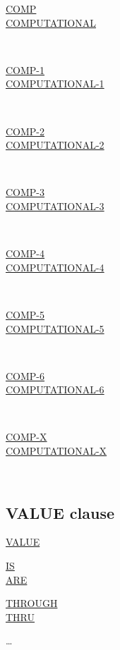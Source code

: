 \documentclass[a4paper,oneside,svgnames]{scrbook}
\makeatletter
\newcommand{\key}[1]{\underline{#1}}
\newcommand{\xopen}[1]{%
  \colorbox{green!75}{#1}}
\newcommand{\miscext}[1]{%
  \colorbox{blue!50}{#1}}
\newenvironment{0-1}{$\left[ \begin{tabular}{@{}l@{}}}{\end{tabular} \right]$}
\newenvironment{1=}{$\left\{ \begin{tabular}{@{}l@{}}}{\end{tabular} \right\}$}
\makeatother
\begin{document}
\begin{1=}
  \begin{1=}
    \key{COMP} \\
    \key{COMPUTATIONAL}
  \end{1=} \\

  \miscext{
    \begin{1=}
      \key{COMP-1} \\
      \key{COMPUTATIONAL-1}
    \end{1=}
  } \\

  \miscext{
    \begin{1=}
      \key{COMP-2} \\
      \key{COMPUTATIONAL-2}
    \end{1=}
  } \\

  \xopen{
    \begin{1=}
      \key{COMP-3} \\
      \key{COMPUTATIONAL-3}
    \end{1=}
  } \\

  \miscext{
    \begin{1=}
      \key{COMP-4} \\
      \key{COMPUTATIONAL-4}
    \end{1=}
  } \\

  \xopen{
    \begin{1=}
      \key{COMP-5} \\
      \key{COMPUTATIONAL-5}
    \end{1=}
  } \\

  \miscext{
    \begin{1=}
      \key{COMP-6} \\
      \key{COMPUTATIONAL-6}
    \end{1=}
  } \\

  \miscext{
    \begin{1=}
      \key{COMP-X} \\
      \key{COMPUTATIONAL-X}
    \end{1=}
  } \\
\end{1=}

\subsection{VALUE clause}
\key{VALUE}
\begin{0-1}
  \key{IS} \\
  \key{ARE}
\end{0-1}
\begin{1=}
  \literal
  \begin{0-1}
    \begin{1=}
      \key{THROUGH} \\
      \key{THRU}
    \end{1=}
    \literal
  \end{0-1}
\end{1=}\ldots
\end{document}
